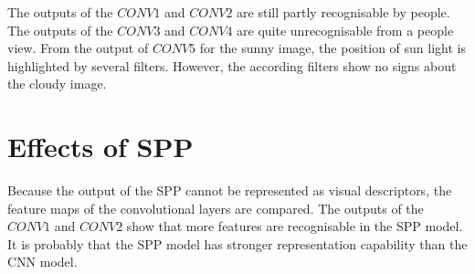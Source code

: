 The outputs of the $CONV1$ and $CONV2$ are still partly recognisable by people. The outputs of the $CONV3$ and $CONV4$ are quite unrecognisable from a people view. From the output of $CONV5$ for the sunny image, the position of sun light is highlighted by several filters. However, the according filters show no signs about the cloudy image.

\section{Effects of SPP}

Because the output of the SPP cannot be represented as visual descriptors, the feature maps of the convolutional layers are compared. The outputs of the $CONV1$ and $CONV2$ show that more features are recognisable in the SPP model. It is probably that the SPP model has stronger representation capability than the CNN model.
 
